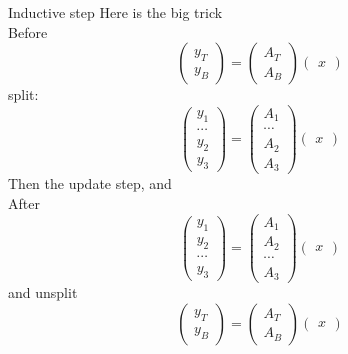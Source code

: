 \begin{block}{Inductive step}
  \small
  Here is the big trick\\
  Before
  \[
  \begin{pmatrix}
    y_T\\ y_B
  \end{pmatrix}
  =
  \begin{pmatrix}
    A_T\\ A_B
  \end{pmatrix}
  \begin{pmatrix}
    x 
  \end{pmatrix}
  \]
  split:
  \[
  \begin{pmatrix}
    y_1\\ \cdots \\ y_2 \\ y_3
  \end{pmatrix}
  =
  \begin{pmatrix}
    A_1\\ \cdots \\ A_2 \\ A_3
  \end{pmatrix}
  \begin{pmatrix}
    x 
  \end{pmatrix}
  \]
  Then the update step, and \\ After
  \[
  \begin{pmatrix}
    y_1\\  y_2 \\ \cdots \\ y_3
  \end{pmatrix}
  =
  \begin{pmatrix}
    A_1 \\ A_2 \\ \cdots \\ A_3
  \end{pmatrix}
  \begin{pmatrix}
    x 
  \end{pmatrix}
  \]
  and unsplit
  \[
  \begin{pmatrix}
    y_T\\ y_B
  \end{pmatrix}
  =
  \begin{pmatrix}
    A_T\\ A_B
  \end{pmatrix}
  \begin{pmatrix}
    x 
  \end{pmatrix}
  \]
\end{block}

